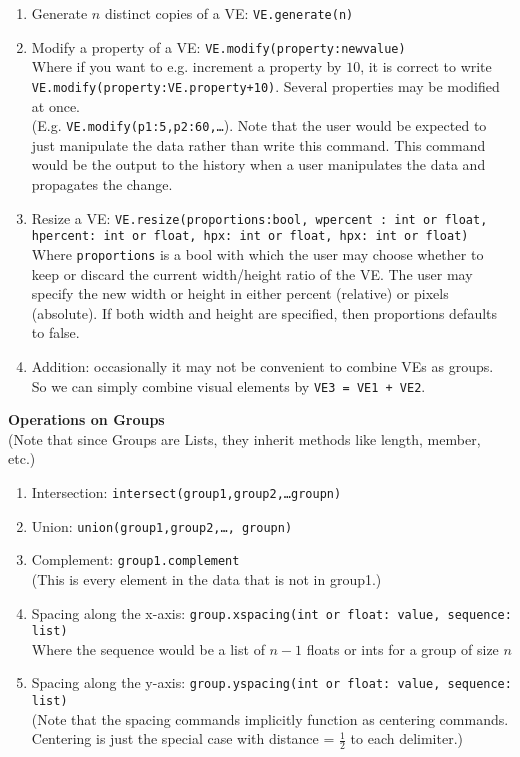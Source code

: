 \documentclass[12pt]{article}
\theoremstyle{remark}
\newcommand{\ttt}[1]{\texttt{#1}}
\begin{document}
\begin{enumerate}
\item Generate $n$ distinct copies of a VE: \ttt{VE.generate(n)}
\item Modify a property of a VE: \ttt{VE.modify(property:newvalue)}
\\
Where if you want to e.g. increment a property by $10$, it is correct to write\\ \ttt{VE.modify(property:VE.property+10)}. Several properties may be modified at once. \\
(E.g. \ttt{VE.modify(p1:5,p2:60,\ldots}). Note that the user would be expected to just manipulate the data rather than write this command. This command would be the output to the history when a user manipulates the data and propagates the change.
\item Resize a VE: \ttt{VE.resize(proportions:bool, wpercent : int or float, hpercent: int or float, hpx: int or float, hpx: int or float)}
\\
Where \ttt{proportions} is a bool with which the user may choose whether to keep or discard the current width/height ratio of the VE. The user may specify the new width or height in either percent (relative) or pixels (absolute). If both width and height are specified, then proportions defaults to false.
\item Addition: occasionally it may not be convenient to combine VEs as groups. So we can simply combine visual elements by \ttt{VE3 = VE1 + VE2}.
\end{enumerate}
\textbf{Operations on Groups}
\\
(Note that since Groups are Lists, they inherit methods like length, member, etc.)
\begin{enumerate}
\item Intersection: \ttt{intersect(group1,group2,\ldots groupn)}
\item Union: \ttt{union(group1,group2,\ldots, groupn)}
\item Complement: \ttt{group1.complement}
\\
(This is every element in the data that is not in group1.)
\item Spacing along the x-axis: \ttt{group.xspacing(int or float: value, sequence: list)}
\\ Where the sequence would be a list of $n-1$ floats or ints for a group of size $n$
\item Spacing along the y-axis: \ttt{group.yspacing(int or float: value, sequence: list)} \\ (Note that the spacing commands implicitly function as centering commands.  Centering is just the special case with distance = $\frac 1 2$ to each delimiter.)
\end{enumerate}
\end{document}

